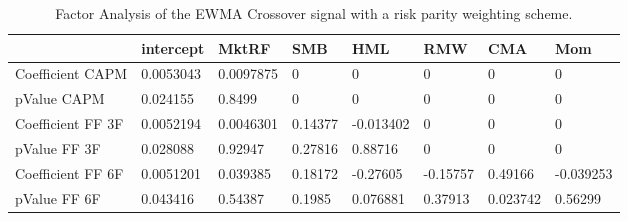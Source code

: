 \begin{table}[H]
\centering
\begin{tabular}{llllllll}
& intercept & MktRF & SMB & HML & RMW & CMA & Mom \\ 
\hline 
Coefficient CAPM & 0.0053043 & 0.0097875 & 0 & 0 & 0 & 0 & 0 \\ 
pValue CAPM & 0.024155 & 0.8499 & 0 & 0 & 0 & 0 & 0 \\ 
Coefficient FF 3F & 0.0052194 & 0.0046301 & 0.14377 & -0.013402 & 0 & 0 & 0 \\ 
pValue FF 3F & 0.028088 & 0.92947 & 0.27816 & 0.88716 & 0 & 0 & 0 \\ 
Coefficient FF 6F & 0.0051201 & 0.039385 & 0.18172 & -0.27605 & -0.15757 & 0.49166 & -0.039253 \\ 
pValue FF 6F & 0.043416 & 0.54387 & 0.1985 & 0.076881 & 0.37913 & 0.023742 & 0.56299 \\ 
\hline
\end{tabular}
\caption{Factor Analysis of the EWMA Crossover signal with a risk parity weighting scheme.}
\label{MBBSRPOQ_FACTOR}
\end{table}